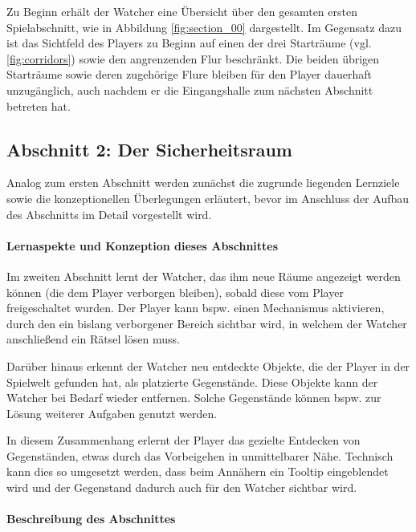 Zu Beginn erhält der Watcher eine Übersicht über den gesamten ersten Spielabschnitt, wie in Abbildung  \ref{fig:section_00} dargestellt. Im Gegensatz dazu ist das Sichtfeld des Players zu Beginn auf einen der drei Starträume (vgl. \ref{fig:corridors}) sowie den angrenzenden Flur beschränkt. Die beiden übrigen Starträume sowie deren zugehörige Flure bleiben für den Player dauerhaft unzugänglich, auch nachdem er die Eingangshalle zum nächsten Abschnitt betreten hat.

\subsection{Abschnitt 2: Der Sicherheitsraum}

Analog zum ersten Abschnitt werden zunächst die zugrunde liegenden Lernziele sowie die konzeptionellen Überlegungen erläutert, bevor im Anschluss der Aufbau des Abschnitts im Detail vorgestellt wird.

\paragraph{Lernaspekte und Konzeption dieses Abschnittes}

Im zweiten Abschnitt lernt der Watcher, das ihm neue Räume angezeigt werden können (die dem Player verborgen bleiben), sobald diese vom Player freigeschaltet wurden. Der Player kann bspw. einen Mechanismus aktivieren, durch den ein bislang verborgener Bereich sichtbar wird, in welchem der Watcher anschließend ein Rätsel lösen muss.

Darüber hinaus erkennt der Watcher neu entdeckte Objekte, die der Player in der Spielwelt gefunden hat, als platzierte Gegenstände. Diese Objekte kann der Watcher bei Bedarf wieder entfernen. Solche Gegenstände können bspw. zur Lösung weiterer Aufgaben genutzt werden.

In diesem Zusammenhang erlernt der Player das gezielte Entdecken von Gegenständen, etwas durch das Vorbeigehen in unmittelbarer Nähe. Technisch kann dies so umgesetzt werden, dass beim Annähern ein Tooltip eingeblendet wird und der Gegenstand dadurch auch für den Watcher sichtbar wird.

\paragraph{Beschreibung des Abschnittes}

